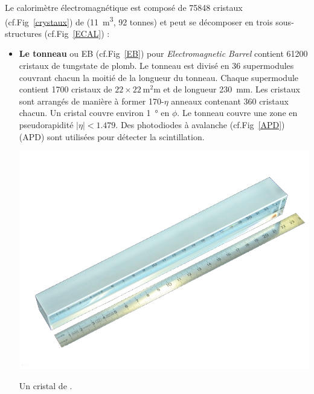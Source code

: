 Le calorimètre électromagnétique est composé de \num{75848} cristaux (cf.Fig~\ref{crystaux}) de  (\SI{11}{\cubic\meter}, \num{92} tonnes) et peut se décomposer en trois sous-structures (cf.Fig~\ref{ECAL}) :
\begin{itemize}[label=$\bullet$]
	\item \textbf{Le tonneau} ou EB (cf.Fig~\ref{EB}) pour \textit{Electromagnetic Barrel} contient \num{61200} cristaux de tungstate de plomb. Le tonneau est divisé en \num{36} supermodules couvrant chacun la moitié de la longueur du tonneau. Chaque supermodule contient \num{1700} cristaux de $\num{22}\times\SI{22}{\square\milli\meter}$ et de longueur \SI{230}{\milli\meter}. Les cristaux sont arrangés de manière à former \num{170}-$\eta$ anneaux contenant \num{360} cristaux chacun. Un cristal couvre environ \SI{1}{\degree} en $\phi$. Le tonneau couvre une zone en pseudorapidité $|\eta|<\num{1.479}$. Des photodiodes à avalanche (cf.Fig~\ref{APD}) (APD) sont utilisées pour détecter la scintillation.
	\marginpar
	{
		\centering
		\includegraphics[width=\marginparwidth]{CMS/Crystaux.png}
		\captionsetup{type=figure}\caption{Un cristal de .}
		\label{crystaux}
	}
	

\end{itemize}
